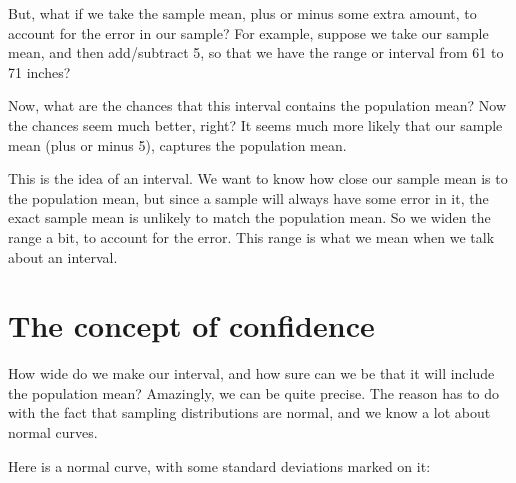 \documentclass[../../../main.tex]{subfiles}
\begin{document}
But, what if we take the sample mean, plus or minus some extra amount, to account for the error in our sample? For example, suppose we take our sample mean, and then add/subtract 5, so that we have the range or interval from 61 to 71 inches? 

Now, what are the chances that this interval contains the population mean? Now the chances seem much better, right? It seems much more likely that our sample mean (plus or minus 5), captures the population mean. 

This is the idea of an interval. We want to know how close our sample mean is to the population mean, but since a sample will always have some error in it, the exact sample mean is unlikely to match the population mean. So we widen the range a bit, to account for the error. This range is what we mean when we talk about an interval.


\section{The concept of confidence}

How wide do we make our interval, and how sure can we be that it will include the population mean? Amazingly, we can be quite precise. The reason has to do with the fact that sampling distributions are normal, and we know a lot about normal curves.

Here is a normal curve, with some standard deviations marked on it:


\begin{center}
\end{center}
\end{document}
